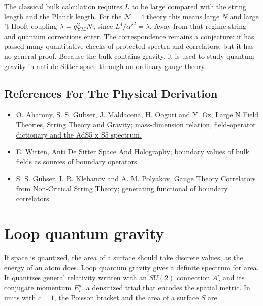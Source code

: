 \documentclass[11pt,oneside]{book}
\begin{document}
The classical bulk calculation requires \(L\) to be large compared with the string length and the Planck length. For the \(\mathcal N=4\) theory this means large \(N\) and large 't Hooft coupling \(\lambda=g_{\rm YM}^2N\), since \(L^4/\alpha'^2=\lambda\). Away from that regime string and quantum corrections enter. The correspondence remains a conjecture: it has passed many quantitative checks of protected spectra and correlators, but it has no general proof. Because the bulk contains gravity, it is used to study quantum gravity in anti-de Sitter space through an ordinary gauge theory.

\subsection*{References For The Physical Derivation}
\begin{itemize}
\item \href{https://arxiv.org/abs/hep-th/9905111}{O. Aharony, S. S. Gubser, J. Maldacena, H. Ooguri and Y. Oz, Large N Field Theories, String Theory and Gravity; mass-dimension relation, field-operator dictionary and the AdS5 x S5 spectrum.}
\item \href{https://arxiv.org/abs/hep-th/9802150}{E. Witten, Anti De Sitter Space And Holography; boundary values of bulk fields as sources of boundary operators.}
\item \href{https://arxiv.org/abs/hep-th/9802109}{S. S. Gubser, I. R. Klebanov and A. M. Polyakov, Gauge Theory Correlators from Non-Critical String Theory; generating functional of boundary correlators.}
\end{itemize}





\clearpage

\section{Loop quantum gravity}

\label{topic:loop-quantum-gravity}

If space is quantized, the area of a surface should take discrete values, as the energy of an atom does. Loop quantum gravity gives a definite spectrum for area. It quantizes general relativity written with an \(SU(2)\) connection \(A^i_a\) and its conjugate momentum \(E^a_i\), a densitized triad that encodes the spatial metric. In units with \(c=1\), the Poisson bracket and the area of a surface \(S\) are
\end{document}
